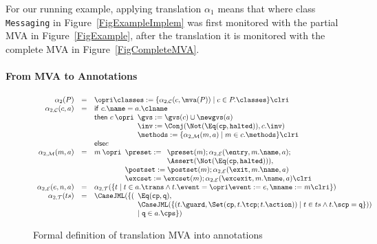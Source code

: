 For our running example, applying translation \(\alpha_1\) means that
where class \texttt{Messaging} in Figure~\ref{FigExampleImplem} was
first monitored with the partial MVA in Figure~\ref{FigExample}, after
the translation it is monitored with the complete MVA in
Figure~\ref{FigCompleteMVA}.

\paragraph{From MVA to Annotations}

\begin{figure}[t]
\[
\begin{array}{rcl}
\alpha_2(P) & = &\opri \classes :=
\{\alpha_{2, \mathcal{C}}(c, \mva(P)) \mid c \in P.\classes\} \clri\\

\alpha_{2,\mathcal{C}}(c, a) & = &
\mathsf{if\ }c.\name = a.\clname\\
&&
\mathsf{then\ }c \:\opri
 \begin{array}[t]{l}
 \gvs := \gvs(c) \cup \newgvs(a)\\
 \inv := \Conj(\Not(\Eq(\texttt{cp}, \texttt{halted})), c.\inv)\\
 \methods := \{\alpha_{2,\mathcal{M}}(m, a) \mid m \in c.\methods\} \clri
\end{array}\\
&& \mathsf{else }c\\
\alpha_{2,\mathcal{M}}(m, a) & = & m \: \opri
  \begin{array}[t]{l}
  \preset := \begin{array}[t]{l}
             \preset(m); \alpha_{2,\mathcal{E}}(\entry, m.\name, a);\\
             \Assert(\Not(\Eq(\texttt{cp}, \texttt{halted}))),
             \end{array}\\
  \postset := \postset(m); \alpha_{2, \mathcal{E}}(\exit, m.\name, a)\\
  \excset := \excset(m); \alpha_{2, \mathcal{E}}(\excexit, m.\name, a)
  \clri
  \end{array}\\
\alpha_{2, \mathcal{E}}(e, n, a) & = &
  \alpha_{2, \mathcal{T}}(\{t \mid t \in a.\trans \wedge
                                   t.\event = \opri \event := e,
                                                    \mname := m \clri
                           \})\\
\alpha_{2, \mathcal{T}}(ts) & = &
  \CaseJML(
    \{(\begin{array}[t]{l}
       \Eq(\texttt{cp}, \texttt{q}),\\
       \CaseJML(\{(t.\guard, \Set(\texttt{cp}, t.\tcp; t.\action)) \mid
                  t \in ts \wedge t.\scp = \texttt{q}
               \}))\\
    \mid \texttt{q} \in a.\cps
    \})
    \end{array}
\end{array}
\]
\caption{Formal definition of translation MVA into annotations}
\label{FigMVAtoAnnot}
\end{figure}


